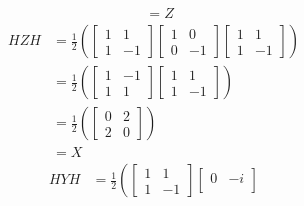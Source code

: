 \begin{examplebox}
\begin{equation}
\begin{aligned}
            &=
            Z
        \end{aligned}
    \end{equation}
    \begin{equation}\label{eq:hadamard-conjugation-2}
        \begin{aligned}
            H Z H &= 
            \frac{1}{2}
            \left(\begin{bmatrix}
                1 & 1 \\
                1 & -1
            \end{bmatrix}
            \begin{bmatrix}
                1 & 0 \\
                0 & -1
            \end{bmatrix}
            \begin{bmatrix}
                1 & 1 \\
                1 & -1
            \end{bmatrix}\right) \\
            &=
            \frac{1}{2}
            \left(\begin{bmatrix}
                1 & -1 \\
                1 & 1
            \end{bmatrix}
            \begin{bmatrix}
                1 & 1 \\
                1 & -1
            \end{bmatrix}\right) \\
            &=
            \frac{1}{2}
            \left(\begin{bmatrix}
                0 & 2 \\
                2 & 0
            \end{bmatrix}\right) \\
            &=
            X
        \end{aligned}
    \end{equation}
    \begin{equation}\label{eq:hadamard-conjugation-3}
        \begin{aligned}
            H Y H &= 
            \frac{1}{2}
            \left(\begin{bmatrix}
                1 & 1 \\
                1 & -1
            \end{bmatrix}
            \begin{bmatrix}
                0 & -i \\

\end{bmatrix}
\end{aligned}
\end{equation}
\end{examplebox}
